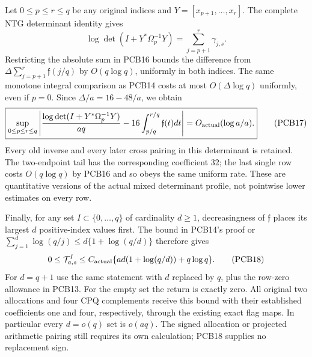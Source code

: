 Let $0\le p\le r\le q$ be any original indices and
$Y=[x_{p+1},\ldots,x_r]$. The complete NTG determinant identity gives
\[
 \log\det(I+Y^*\Omega_p^{-1}Y)
      =\sum_{j=p+1}^{r}\gamma_{j,s}.
\]
Restricting the absolute sum in PCB16 bounds the difference from
$\Delta\sum_{j=p+1}^r\mathfrak f(j/q)$ by $O(q\log q)$,
uniformly in both indices. The same monotone integral comparison as PCB14
costs at most $O(\Delta\log q)$ uniformly, even if $p=0$.
Since $\Delta/a=16-48/a$, we obtain
\[
 \boxed{\sup_{0\le p\le r\le q}
 \left|\frac{\log\det(I+Y^*\Omega_p^{-1}Y)}{aq}
       -16\int_{p/q}^{r/q}\mathfrak f(t)dt\right|
       =O_{\rm actual}(\log a/a).}
 \tag{PCB17}
\]
Every old inverse and every later cross pairing in this determinant is
retained. The two-endpoint tail has the corresponding coefficient $32$;
the last single row costs $O(q\log q)$ by PCB16 and so obeys the same
uniform rate. These are quantitative versions of the actual mixed
determinant profile, not pointwise lower estimates on every row.

Finally, for any set $I\subset\{0,\ldots,q\}$ of cardinality $d\ge1$,
decreasingness of $\mathfrak f$ places its largest $d$ positive-index
values first. The bound in PCB14's proof or
$\sum_{j=1}^d\log(q/j)\le d\{1+\log(q/d)\}$ therefore gives
\[
 0\le\mathcal T^I_{a,s}
    \le C_{\rm actual}\{ad(1+\log(q/d))+q\log q\}.
 \tag{PCB18}
\]
For $d=q+1$ use the same statement with $d$ replaced by $q$, plus the
row-zero allowance in PCB13. For the empty set the return is exactly zero.
All original two allocations and four CPQ complements receive this bound
with their established coefficients one and four, respectively, through
the existing exact flag maps. In particular every $d=o(q)$ set is
$o(aq)$. The signed allocation or projected arithmetic pairing still
requires its own calculation; PCB18 supplies no replacement sign.
\endgroup
